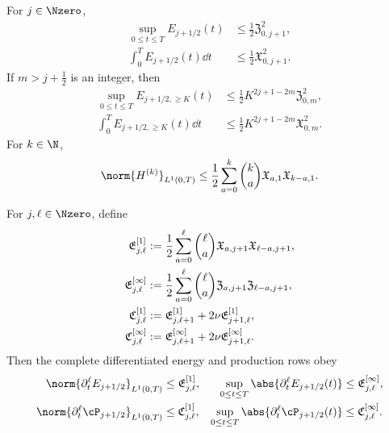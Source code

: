 {\begin{theorem}
For \(j\in\Nzero\),
\begin{align}
 \sup_{0\le t\le T}E_{j+1/2}(t)
 &\le\frac12\mathfrak Z_{0,j+1}^2,
 \label{u:eq:qc-sharp-critical-sup}\\
 \int_0^TE_{j+1/2}(t)\dd t
 &\le\frac12\mathfrak X_{0,j+1}^2.
 \label{u:eq:qc-sharp-critical-mass}
\end{align}
If \(m>j+\frac12\) is an integer, then
\begin{align}
 \sup_{0\le t\le T}E_{j+1/2,\ge K}(t)
 &\le\frac12K^{2j+1-2m}\mathfrak Z_{0,m}^2,
 \label{u:eq:qc-sharp-critical-tail-sup}\\
 \int_0^TE_{j+1/2,\ge K}(t)\dd t
 &\le\frac12K^{2j+1-2m}\mathfrak X_{0,m}^2.
 \label{u:eq:qc-sharp-critical-tail-mass}
\end{align}
For \(k\in\N\),
\begin{equation}
 \norm{H^{(k)}}_{L^1(0,T)}
 \le\frac12\sum_{a=0}^{k}\binom ka
 \mathfrak X_{a,1}\mathfrak X_{k-a,1}.
 \label{u:eq:qc-sharp-height-derivatives}
\end{equation}
\begin{samepage}
For \(j,\ell\in\Nzero\), define
\begin{align}
 \mathfrak E_{j,\ell}^{[1]}
 &:=\frac12\sum_{a=0}^{\ell}\binom\ell a
 \mathfrak X_{a,j+1}\mathfrak X_{\ell-a,j+1},
 \notag\\
 \mathfrak E_{j,\ell}^{[\infty]}
 &:=\frac12\sum_{a=0}^{\ell}\binom\ell a
 \mathfrak Z_{a,j+1}\mathfrak Z_{\ell-a,j+1},
 \label{u:eq:qc-height-row-majorants}\\
 \mathfrak C_{j,\ell}^{[1]}
 &:=\mathfrak E_{j,\ell+1}^{[1]}
    +2\nu\mathfrak E_{j+1,\ell}^{[1]},
 \notag\\
 \mathfrak C_{j,\ell}^{[\infty]}
 &:=\mathfrak E_{j,\ell+1}^{[\infty]}
    +2\nu\mathfrak E_{j+1,\ell}^{[\infty]}.
 \label{u:eq:qc-production-row-majorants}
\end{align}
Then the complete differentiated energy and production rows obey
\begin{align}
 \norm{\partial_t^\ell E_{j+1/2}}_{L^1(0,T)}
 &\le\mathfrak E_{j,\ell}^{[1]},
 &
 \sup_{0\le t\le T}
 \abs{\partial_t^\ell E_{j+1/2}(t)}
 &\le\mathfrak E_{j,\ell}^{[\infty]},
 \label{u:eq:qc-sharp-energy-row-family}\\
 \norm{\partial_t^\ell\cP_{j+1/2}}_{L^1(0,T)}
 &\le\mathfrak C_{j,\ell}^{[1]},
 &
 \sup_{0\le t\le T}
 \abs{\partial_t^\ell\cP_{j+1/2}(t)}
 &\le\mathfrak C_{j,\ell}^{[\infty]}.
 \label{u:eq:qc-sharp-production-row-family}
\end{align}
\end{samepage}

\end{theorem}}
